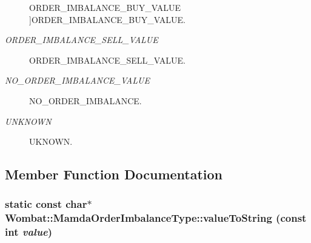 \begin{Desc}
\begin{description}
{\hypertarget{classWombat_1_1MamdaOrderImbalanceType_1d6586915356b2aa4c6931591f172c14fdc23112b702f43eed612464e5bbedf3}{
ORDER\_\-IMBALANCE\_\-BUY\_\-VALUE}
\label{classWombat_1_1MamdaOrderImbalanceType_1d6586915356b2aa4c6931591f172c14fdc23112b702f43eed612464e5bbedf3}
}]ORDER\_\-IMBALANCE\_\-BUY\_\-VALUE. \item[{\em 
\hypertarget{classWombat_1_1MamdaOrderImbalanceType_1d6586915356b2aa4c6931591f172c14e06b6e6ef1d914936904fa3b162c301d}{
ORDER\_\-IMBALANCE\_\-SELL\_\-VALUE}
\label{classWombat_1_1MamdaOrderImbalanceType_1d6586915356b2aa4c6931591f172c14e06b6e6ef1d914936904fa3b162c301d}
}]ORDER\_\-IMBALANCE\_\-SELL\_\-VALUE. \item[{\em 
\hypertarget{classWombat_1_1MamdaOrderImbalanceType_1d6586915356b2aa4c6931591f172c1496509fb02f277e375ac4221111d96bcf}{
NO\_\-ORDER\_\-IMBALANCE\_\-VALUE}
\label{classWombat_1_1MamdaOrderImbalanceType_1d6586915356b2aa4c6931591f172c1496509fb02f277e375ac4221111d96bcf}
}]NO\_\-ORDER\_\-IMBALANCE. \item[{\em 
\hypertarget{classWombat_1_1MamdaOrderImbalanceType_1d6586915356b2aa4c6931591f172c1433be8bffa474d3dcbc2cf0ccd3629572}{
UNKNOWN}
\label{classWombat_1_1MamdaOrderImbalanceType_1d6586915356b2aa4c6931591f172c1433be8bffa474d3dcbc2cf0ccd3629572}
}]UKNOWN. \end{description}
\end{Desc}



\subsection{Member Function Documentation}
\hypertarget{classWombat_1_1MamdaOrderImbalanceType_472a23cf11563b1ae4c675798d0b194e}{
\subsubsection[valueToString]{\setlength{\rightskip}{0pt plus 5cm}static const char$\ast$ Wombat::Mamda\-Order\-Imbalance\-Type::value\-To\-String (const int {\em value})}}
\label{classWombat_1_1MamdaOrderImbalanceType_472a23cf11563b1ae4c675798d0b194e}


